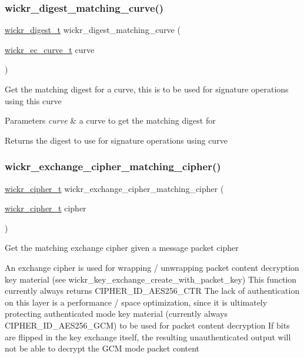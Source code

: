 \subsubsection{\texorpdfstring{wickr\_digest\_matching\_curve()}{wickr\_digest\_matching\_curve()}}
{\footnotesize\ttfamily \mbox{\hyperlink{structwickr__digest}{wickr\+\_\+digest\+\_\+t}} wickr\+\_\+digest\+\_\+matching\+\_\+curve (\begin{DoxyParamCaption}\item[{\mbox{\hyperlink{structwickr__ec__curve}{wickr\+\_\+ec\+\_\+curve\+\_\+t}}}]{curve }\end{DoxyParamCaption})}

Get the matching digest for a curve, this is to be used for signature operations using this curve


\begin{DoxyParams}{Parameters}
{\em curve} & a curve to get the matching digest for \\
\hline
\end{DoxyParams}
\begin{DoxyReturn}{Returns}
the digest to use for signature operations using \textquotesingle{}curve\textquotesingle{} 
\end{DoxyReturn}
\mbox{\label{group__wickr__crypto__engine_gaf44e3be9066727bf83034d3593dc74e2}} 
\subsubsection{\texorpdfstring{wickr\_exchange\_cipher\_matching\_cipher()}{wickr\_exchange\_cipher\_matching\_cipher()}}
{\footnotesize\ttfamily \mbox{\hyperlink{structwickr__cipher}{wickr\+\_\+cipher\+\_\+t}} wickr\+\_\+exchange\+\_\+cipher\+\_\+matching\+\_\+cipher (\begin{DoxyParamCaption}\item[{\mbox{\hyperlink{structwickr__cipher}{wickr\+\_\+cipher\+\_\+t}}}]{cipher }\end{DoxyParamCaption})}

Get the matching exchange cipher given a message packet cipher

An exchange cipher is used for wrapping / unwrapping packet content decryption key material (see wickr\+\_\+key\+\_\+exchange\+\_\+create\+\_\+with\+\_\+packet\+\_\+key) This function currently always returns C\+I\+P\+H\+E\+R\+\_\+\+I\+D\+\_\+\+A\+E\+S256\+\_\+\+C\+TR The lack of authentication on this layer is a performance / space optimization, since it is ultimately protecting authenticated mode key material (currently always C\+I\+P\+H\+E\+R\+\_\+\+I\+D\+\_\+\+A\+E\+S256\+\_\+\+G\+CM) to be used for packet content decryption If bits are flipped in the key exchange itself, the resulting unauthenticated output will not be able to decrypt the G\+CM mode packet content


